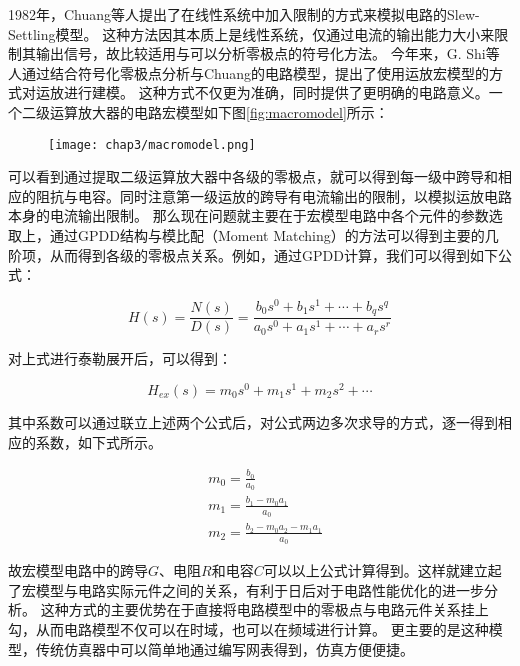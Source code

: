 1982年，Chuang等人提出了在线性系统中加入限制的方式来模拟电路的Slew-Settling模型\parencite{Chuang-Slew-1982}。
这种方法因其本质上是线性系统，仅通过电流的输出能力大小来限制其输出信号，故比较适用与可以分析零极点的符号化方法。
今年来，G. Shi等人通过结合符号化零极点分析与Chuang的电路模型\parencite{ZhangHe-Slew-2011,ZhangAilin-Slew-2015}，提出了使用运放宏模型的方式对运放进行建模。
这种方式不仅更为准确，同时提供了更明确的电路意义。一个二级运算放大器的电路宏模型如下图\ref{fig:macromodel}所示：

\begin{figure}[!htp]
	\centering
	\texttt{[image: chap3/macromodel.png]}
\end{figure}

可以看到通过提取二级运算放大器中各级的零极点，就可以得到每一级中跨导和相应的阻抗与电容。同时注意第一级运放的跨导有电流输出的限制，以模拟运放电路本身的电流输出限制。
那么现在问题就主要在于宏模型电路中各个元件的参数选取上，通过GPDD结构与模比配（Moment Matching）的方法可以得到主要的几阶项，从而得到各级的零极点关系。例如，通过GPDD计算，我们可以得到如下公式：

\begin{equation}
H\left( s \right) = \frac{{N\left( s \right)}}
{{D\left( s \right)}} = \frac{{{b_0}{s^0} + {b_1}{s^1} +  \cdots  + {b_q}{s^q}}}
{{{a_0}{s^0} + {a_1}{s^1} +  \cdots  + {a_r}{s^r}}}
\end{equation}

对上式进行泰勒展开后，可以得到：

\begin{equation}
{H_{ex}}\left( s \right) = {m_0}{s^0} + {m_1}{s^1} + {m_2}{s^2} +  \cdots
\end{equation}

其中系数可以通过联立上述两个公式后，对公式两边多次求导的方式，逐一得到相应的系数，如下式所示。

\begin{align}
& m_0 = \frac{b_0}{a_0} \nonumber \\
& m_1 = \frac{{b_1} - {m_0}{a_1}}{a_0} \nonumber \\
& m_2 = \frac{{b_2} - {m_0}{a_2} - {m_1}{a_1}}{a_0} 
\end{align}

故宏模型电路中的跨导$G$、电阻$R$和电容$C$可以以上公式计算得到。这样就建立起了宏模型与电路实际元件之间的关系，有利于日后对于电路性能优化的进一步分析。
这种方式的主要优势在于直接将电路模型中的零极点与电路元件关系挂上勾，从而电路模型不仅可以在时域，也可以在频域进行计算。
更主要的是这种模型，传统仿真器中可以简单地通过编写网表得到，仿真方便便捷。

